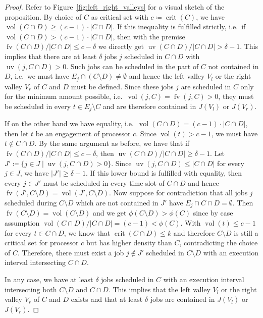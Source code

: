 \documentclass[a4paper]{article}
\DeclareMathOperator{\fv}{fv}
\DeclareMathOperator{\uv}{uv}
\DeclareMathOperator{\vol}{vol}
\DeclareMathOperator{\crit}{crit}
\begin{document}
\begin{proof}
  Refer to Figure~\ref{fig:left_right_valleys} for a visual sketch of the proposition.
  By choice of $C$ as critical set with $c \coloneqq \crit(C)$, we have $\vol(C \cap D) \geq (c-1) \cdot |C \cap D|$.
  If this inequality is fulfilled strictly, i.e.\ if
  $\vol(C \cap D) > (c-1) \cdot |C \cap D|$, then with the premise
  $\fv(C \cap D) / |C \cap D| \leq c - \delta$ we directly get $\uv(C \cap D) / |C \cap D| > \delta - 1$.
  This implies that there are at least $\delta$ jobs $j$ scheduled in $C \cap D$ with $\uv(j, C \cap D) > 0$.
  Such jobs can be scheduled in the part of $C$ not contained in $D$, i.e.\ we must have $E_j \cap (C \setminus D) \neq \emptyset$ and hence the left valley $V_l$ or the right valley $V_r$ of $C$ and $D$ must be defined.
  Since these jobs $j$ are scheduled in $C$ only for the minimum amount possible, i.e.\ $\vol(j, C) = \fv(j, C) > 0$, they must be scheduled in every $t \in E_j \setminus C$ and are therefore contained in $J(V_l)$ or $J(V_r)$.

  If on the other hand we have equality, i.e.\ $\vol(C \cap D) = (c-1) \cdot |C \cap D|$, then let $t$ be an engagement of processor $c$.
  Since $\vol(t) > c-1$, we must have $t \notin C \cap D$.
  By the same argument as before, we have that if $\fv(C \cap D) / |C \cap D| \leq c - \delta$, then $\uv(C \cap D) / |C \cap D| \geq \delta - 1$.
  Let $J' \coloneqq \{ j \in J \mid \uv(j, C \cap D) > 0 \}$.
  Since $\uv(j, C \cap D) \leq | C \cap D |$ for every $j \in J$, we have $|J'| \geq \delta - 1$.
  If this lower bound is fulfilled with equality, then every $j \in J'$ must be scheduled in every time slot of $C \cap D$ and hence $\fv(J', C \setminus D) = \vol(J', C \setminus D)$.
  Now suppose for contradiction that all jobs $j$ scheduled during $C \setminus D$ which are not contained in $J'$ have $E_j \cap C \cap D = \emptyset$.
  Then $\fv(C \setminus D) = \vol(C \setminus D)$ and
  we get $\phi(C \setminus D) > \phi(C)$ since by case assumption $\vol(C \cap D) / |C \cap D| = (c-1) < \phi(C)$.
  With $\vol(t) \leq c - 1$ for every $t \in C \cap D$, we know that $\crit(C \cap D) \leq k$ and therefore $C \setminus D$ is still a critical set for processor $c$ but has higher density than $C$, contradicting the choice of $C$.
  Therefore, there must exist a job $j \notin J'$ scheduled in $C \setminus D$ with an execution interval intersecting $C \cap D$.

  In any case, we have at least $\delta$ jobs scheduled in $C$ with an execution interval intersecting both $C \setminus D$ and $C \cap D$.
  This implies that the left valley $V_l$ or the right valley $V_r$ of $C$ and $D$ exists and that at least $\delta$ jobs are contained in $J(V_l)$ or $J(V_r)$.
\end{proof}
\end{document}
